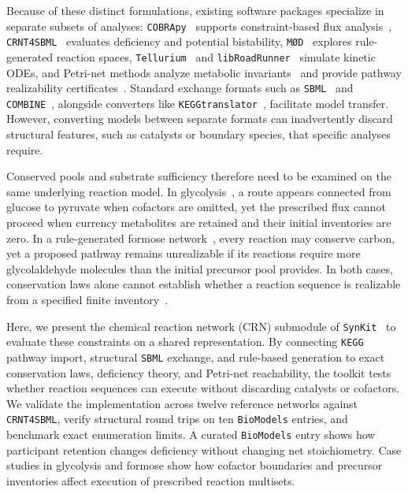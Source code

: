 \documentclass[10pt,a4paper,fleqn]{article}
\newcommand{\synkit}{\texttt{SynKit}\xspace}
\begin{document}
Because of these distinct formulations, existing software packages specialize in separate subsets of analyses: \texttt{COBRApy}~\cite{ebrahim2013cobrapy} supports constraint-based flux analysis~\cite{orth2010fba}, \texttt{CRNT4SBML}~\cite{reyes2020crnt4sbml} evaluates deficiency and potential bistability, \texttt{M\O D}~\cite{andersen2016mod} explores rule-generated reaction spaces, \texttt{Tellurium}~\cite{choi2018tellurium} and \texttt{libRoadRunner}~\cite{welsh2023libroadrunner} simulate kinetic ODEs, and Petri-net methods analyze metabolic invariants~\cite{zevedei2003topological,murata1989petri} and provide pathway realizability certificates~\cite{andersen2023realisability}. Standard exchange formats such as \texttt{SBML}~\cite{hucka2003sbml} and \texttt{COMBINE}~\cite{bergmann2014combine}, alongside converters like \texttt{KEGGtranslator}~\cite{wrzodek2011keggtranslator}, facilitate model transfer. However, converting models between separate formats can inadvertently discard structural features, such as catalysts or boundary species, that specific analyses require.

Conserved pools and substrate sufficiency therefore need to be examined on the same underlying reaction model. In glycolysis~\cite{kanehisa2025kegg}, a route appears connected from glucose to pyruvate when cofactors are omitted, yet the prescribed flux cannot proceed when currency metabolites are retained and their initial inventories are zero. In a rule-generated formose network~\cite{butlerov1861formose}, every reaction may conserve carbon, yet a proposed pathway remains unrealizable if its reactions require more glycolaldehyde molecules than the initial precursor pool provides. In both cases, conservation laws alone cannot establish whether a reaction sequence is realizable from a specified finite inventory~\cite{andersen2023realisability}.

Here, we present the chemical reaction network (CRN) submodule of \synkit~\cite{phan2025synkit} to evaluate these constraints on a shared representation. By connecting \texttt{KEGG} pathway import, structural \texttt{SBML} exchange, and rule-based generation to exact conservation laws, deficiency theory, and Petri-net reachability, the toolkit tests whether reaction sequences can execute without discarding catalysts or cofactors. We validate the implementation across twelve reference networks against \texttt{CRNT4SBML}, verify structural round trips on ten \texttt{BioModels} entries, and benchmark exact enumeration limits. A curated \texttt{BioModels} entry shows how participant retention changes deficiency without changing net stoichiometry. Case studies in glycolysis and formose show how cofactor boundaries and precursor inventories affect execution of prescribed reaction multisets.
\end{document}
